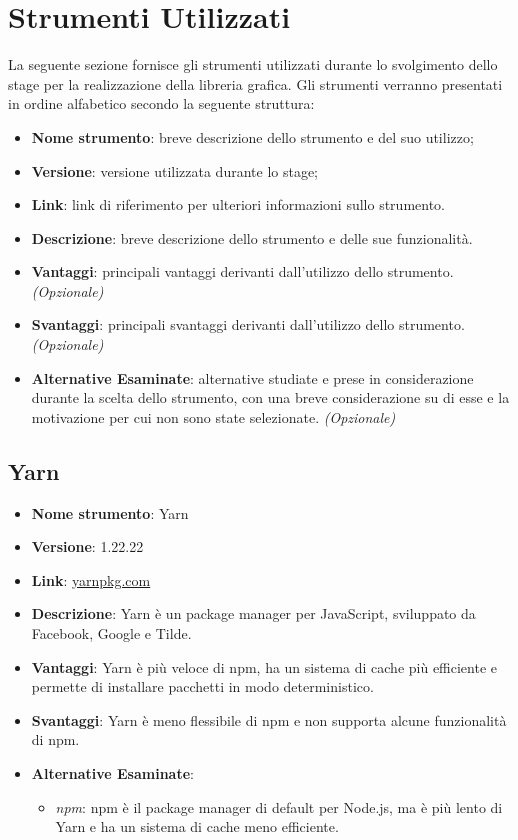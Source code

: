 \section{Strumenti Utilizzati}
La seguente sezione fornisce gli strumenti utilizzati durante lo svolgimento dello stage per la realizzazione della libreria grafica.
Gli strumenti verranno presentati in ordine alfabetico secondo la seguente struttura:
\begin{itemize}
      \item \textbf{Nome strumento}: breve descrizione dello strumento e del suo utilizzo;
      \item \textbf{Versione}: versione utilizzata durante lo stage;
      \item \textbf{Link}: link di riferimento per ulteriori informazioni sullo strumento.
      \item \textbf{Descrizione}: breve descrizione dello strumento e delle sue funzionalità.
      \item \textbf{Vantaggi}: principali vantaggi derivanti dall'utilizzo dello strumento. \textit{(Opzionale)}
      \item \textbf{Svantaggi}: principali svantaggi derivanti dall'utilizzo dello strumento. \textit{(Opzionale)}
      \item \textbf{Alternative Esaminate}: alternative studiate e prese in considerazione durante la scelta dello strumento, con una breve considerazione
            su di esse e la motivazione per cui non sono state selezionate. \textit{(Opzionale)}
\end{itemize}

\subsection{Yarn}
\begin{itemize}
      \item \textbf{Nome strumento}: Yarn
      \item \textbf{Versione}: 1.22.22
      \item \textbf{Link}: \href{https://yarnpkg.com/}{yarnpkg.com}
      \item \textbf{Descrizione}: Yarn è un package manager per JavaScript, sviluppato da Facebook, Google e Tilde.
      \item \textbf{Vantaggi}: Yarn è più veloce di npm, ha un sistema di cache più efficiente e permette di installare pacchetti in modo deterministico.
      \item \textbf{Svantaggi}: Yarn è meno flessibile di npm e non supporta alcune funzionalità di npm.
      \item \textbf{Alternative Esaminate}:
            \begin{itemize}
                  \item \textit{npm}: npm è il package manager di default per Node.js, ma è più lento di Yarn e ha un sistema di cache meno efficiente.
            \end{itemize}
\end{itemize}

